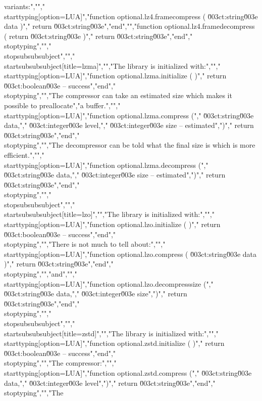 variants:","","\\starttyping[option=LUA]","function optional.lz4.framecompress ( \u003ct:string\u003e data )","    return \u003ct:string\u003e","end","","function optional.lz4.framedecompress ( return \u003ct:string\u003e  )","    return \u003ct:string\u003e","end","\\stoptyping","","\\stopsubsubsubject","","\\startsubsubsubject[title=lzma]","","The library is initialized with:","","\\starttyping[option=LUA]","function optional.lzma.initialize ( )","    return \u003ct:boolean\u003e -- success","end","\\stoptyping","","The compressor can take an estimated size which makes it possible to preallocate","a buffer.","","\\starttyping[option=LUA]","function optional.lzma.compress (","    \u003ct:string\u003e  data,","    \u003ct:integer\u003e level,","    \u003ct:integer\u003e size   -- estimated",")","    return \u003ct:string\u003e","end","\\stoptyping","","The decompressor can be told what the final size is which is more efficient.","","\\starttyping[option=LUA]","function optional.lzma.decompress (","    \u003ct:string\u003e  data,","    \u003ct:integer\u003e size   -- estimated",")","    return \u003ct:string\u003e","end","\\stoptyping","","\\stopsubsubsubject","","\\startsubsubsubject[title=lzo]","","The library is initialized with:","","\\starttyping[option=LUA]","function optional.lzo.initialize ( )","    return \u003ct:boolean\u003e -- success","end","\\stoptyping","","There is not much to tell about:","","\\starttyping[option=LUA]","function optional.lzo.compress ( \u003ct:string\u003e data )","    return \u003ct:string\u003e","end","\\stoptyping","","and","","\\starttyping[option=LUA]","function optional.lzo.decompresssize (","    \u003ct:string\u003e  data,","    \u003ct:integer\u003e size",")","    return \u003ct:string\u003e","end","\\stoptyping","","\\stopsubsubsubject","","\\startsubsubsubject[title=zstd]","","The library is initialized with:","","\\starttyping[option=LUA]","function optional.zstd.initialize ( )","    return \u003ct:boolean\u003e -- success","end","\\stoptyping","","The compressor:","","\\starttyping[option=LUA]","function optional.zstd.compress (","    \u003ct:string\u003e  data,","    \u003ct:integer\u003e level",")","    return \u003ct:string\u003e","end","\\stoptyping","","The 